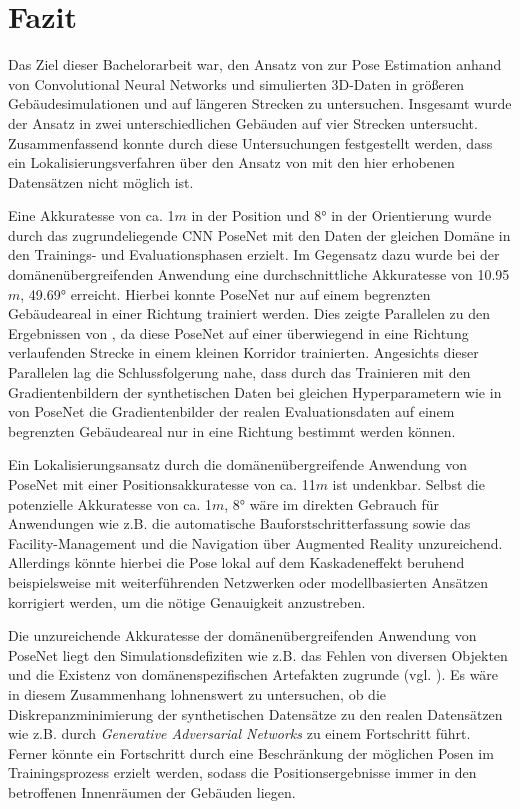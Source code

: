 
\section{Fazit}
\label{sec:kapitel_6}
Das Ziel dieser Bachelorarbeit war, den Ansatz von \citet{acharyaBIMPoseNetIndoorCamera2019} zur Pose Estimation anhand von Convolutional Neural Networks und simulierten 3D-Daten in größeren Gebäudesimulationen und auf längeren Strecken zu untersuchen.
Insgesamt wurde der Ansatz in zwei unterschiedlichen Gebäuden auf vier Strecken untersucht. Zusammenfassend konnte durch diese Untersuchungen festgestellt werden, dass ein Lokalisierungsverfahren über den Ansatz von \citet{acharyaBIMPoseNetIndoorCamera2019} mit den hier erhobenen Datensätzen nicht möglich ist.


Eine Akkuratesse von ca. 1$m$ in der Position und 8° in der Orientierung wurde durch das zugrundeliegende CNN PoseNet mit den Daten der gleichen Domäne in den Trainings- und Evaluationsphasen erzielt. Im Gegensatz dazu wurde bei der domänenübergreifenden Anwendung eine durchschnittliche Akkuratesse von 10.95$m$, 49.69° erreicht. Hierbei konnte PoseNet nur auf einem begrenzten Gebäudeareal in einer Richtung trainiert werden. Dies zeigte Parallelen zu den Ergebnissen von \citet{acharyaBIMPoseNetIndoorCamera2019}, da diese PoseNet auf einer überwiegend in eine Richtung verlaufenden Strecke in einem kleinen Korridor trainierten. Angesichts dieser Parallelen lag die Schlussfolgerung nahe, dass durch das Trainieren mit den Gradientenbildern der synthetischen Daten bei gleichen Hyperparametern wie in \cite{acharyaBIMPoseNetIndoorCamera2019} von PoseNet die Gradientenbilder der realen Evaluationsdaten auf einem begrenzten Gebäudeareal nur in eine Richtung bestimmt werden können.

Ein Lokalisierungsansatz durch die domänenübergreifende Anwendung von PoseNet mit einer Positionsakkuratesse von ca. 11$m$ ist undenkbar. Selbst die potenzielle Akkuratesse von ca. 1$m$, 8° wäre im direkten Gebrauch für Anwendungen wie z.B. die automatische Bauforstschritterfassung sowie das Facility-Manage\-ment und die Navigation über Augmented Reality unzureichend. Allerdings könnte hierbei die Pose lokal auf dem Kaskadeneffekt beruhend beispielsweise mit weiterführenden Netzwerken oder modellbasierten Ansätzen korrigiert werden, um die nötige Genauigkeit anzustreben.

Die unzureichende Akkuratesse der domänenübergreifenden Anwendung von PoseNet liegt den Simulationsdefiziten wie z.B. das Fehlen von diversen Objekten und die Existenz von domänenspezifischen Artefakten zugrunde (vgl. \cite{acharyaBIMPoseNetIndoorCamera2019}). Es wäre in diesem Zusammenhang lohnenswert zu untersuchen, ob die Diskrepanzminimierung der synthetischen Datensätze zu den realen Datensätzen wie z.B. durch \textit{Generative Adversarial Networks} zu einem Fortschritt führt. Ferner könnte ein Fortschritt durch eine Beschränkung der möglichen Posen im Trainingsprozess erzielt werden, sodass die Positionsergebnisse immer in den betroffenen Innenräumen der Gebäuden liegen.

